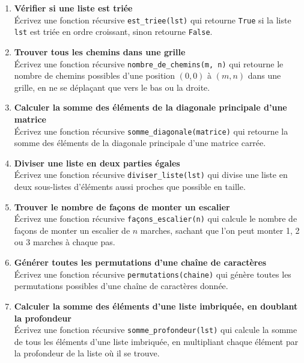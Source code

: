 \begin{enumerate}
    \item \textbf{Vérifier si une liste est triée} \\
    Écrivez une fonction récursive \texttt{est\_triee(lst)} qui retourne \texttt{True} si la liste \texttt{lst} est triée en ordre croissant, sinon retourne \texttt{False}.

    \item \textbf{Trouver tous les chemins dans une grille} \\
    Écrivez une fonction récursive \texttt{nombre\_de\_chemins(m, n)} qui retourne le nombre de chemins possibles d'une position $(0, 0)$ à $(m, n)$ dans une grille, en ne se déplaçant que vers le bas ou la droite.

    \item \textbf{Calculer la somme des éléments de la diagonale principale d'une matrice} \\
    Écrivez une fonction récursive \texttt{somme\_diagonale(matrice)} qui retourne la somme des éléments de la diagonale principale d'une matrice carrée.

    \item \textbf{Diviser une liste en deux parties égales} \\
    Écrivez une fonction récursive \texttt{diviser\_liste(lst)} qui divise une liste en deux sous-listes d'éléments aussi proches que possible en taille.

    \item \textbf{Trouver le nombre de façons de monter un escalier} \\
    Écrivez une fonction récursive \texttt{façons\_escalier(n)} qui calcule le nombre de façons de monter un escalier de $n$ marches, sachant que l'on peut monter 1, 2 ou 3 marches à chaque pas.

    \item \textbf{Générer toutes les permutations d'une chaîne de caractères} \\
    Écrivez une fonction récursive \texttt{permutations(chaine)} qui génère toutes les permutations possibles d'une chaîne de caractères donnée.

    \item \textbf{Calculer la somme des éléments d'une liste imbriquée, en doublant la profondeur} \\
    Écrivez une fonction récursive \texttt{somme\_profondeur(lst)} qui calcule la somme de tous les éléments d'une liste imbriquée, en multipliant chaque élément par la profondeur de la liste où il se trouve.


\end{enumerate}
